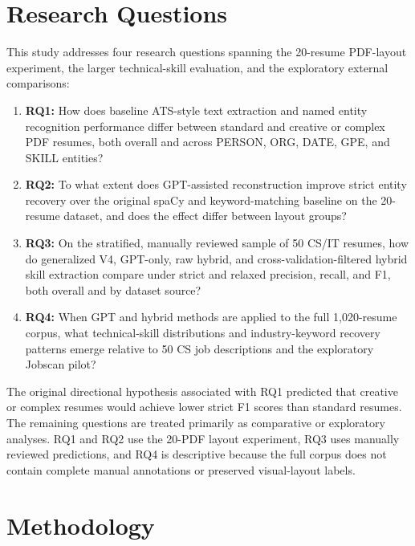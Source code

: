 \documentclass[conference]{IEEEtran}
\begin{document}
\section{Research Questions}

This study addresses four research questions spanning the 20-resume
PDF-layout experiment, the larger technical-skill evaluation, and the
exploratory external comparisons:

\begin{enumerate}
    \item \textbf{RQ1:} How does baseline ATS-style text extraction and
    named entity recognition performance differ between standard and
    creative or complex PDF resumes, both overall and across PERSON,
    ORG, DATE, GPE, and SKILL entities?

    \item \textbf{RQ2:} To what extent does GPT-assisted reconstruction
    improve strict entity recovery over the original spaCy and
    keyword-matching baseline on the 20-resume dataset, and does the
    effect differ between layout groups?

    \item \textbf{RQ3:} On the stratified, manually reviewed sample of
    50 CS/IT resumes, how do generalized V4, GPT-only, raw hybrid, and
    cross-validation-filtered hybrid skill extraction compare under
    strict and relaxed precision, recall, and F1, both overall and by
    dataset source?

    \item \textbf{RQ4:} When GPT and hybrid methods are applied to the
    full 1,020-resume corpus, what technical-skill distributions and
    industry-keyword recovery patterns emerge relative to 50 CS job
    descriptions and the exploratory Jobscan pilot?
\end{enumerate}

The original directional hypothesis associated with RQ1 predicted that
creative or complex resumes would achieve lower strict F1 scores than
standard resumes. The remaining questions are treated primarily as
comparative or exploratory analyses. RQ1 and RQ2 use the
20-PDF layout experiment, RQ3 uses manually reviewed predictions, and RQ4 is
descriptive because the full corpus does not contain complete manual
annotations or preserved visual-layout labels.

\section{Methodology}
\end{document}
